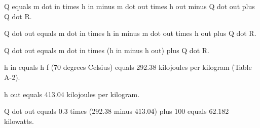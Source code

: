 Q equals m dot in times h in minus m dot out times h out minus Q dot out plus Q dot R.  

Q dot out equals m dot in times h in minus m dot out times h out plus Q dot R.  

Q dot out equals m dot in times (h in minus h out) plus Q dot R.  

h in equals h f (70 degrees Celsius) equals 292.38 kilojoules per kilogram (Table A-2).  

h out equals 413.04 kilojoules per kilogram.  

Q dot out equals 0.3 times (292.38 minus 413.04) plus 100 equals 62.182 kilowatts.